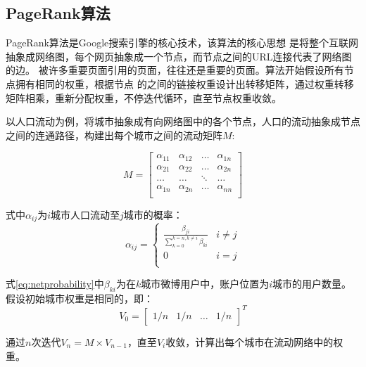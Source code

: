 \subsection{PageRank算法}
PageRank算法是Google搜索引擎的核心技术\cite{Boldi2009PageRank}，该算法的核心思想
是将整个互联网抽象成网络图，每个网页抽象成一个节点，而节点之间的URL连接代表了网络图的边。
被许多重要页面引用的页面，往往还是重要的页面。算法开始假设所有节点拥有相同的权重，根据节点
的之间的链接权重设计出转移矩阵，通过权重转移矩阵相乘，重新分配权重，不停迭代循环，直至节点权重收敛。

以人口流动为例，将城市抽象成有向网络图中的各个节点，人口的流动抽象成节点之间的连通路径，构建出每个城市之间的流动矩阵$M$:

\[
  M=
\begin{bmatrix}
\alpha_{11} & \alpha_{12} & \ldots & \alpha_{1n} \\
\alpha_{21} & \alpha_{22} & \ldots & \alpha_{2n} \\
\ldots & \ldots & \ddots & \ldots \\
\alpha_{1n} & \alpha_{2n} & \ldots & \alpha_{nn} \\
\end{bmatrix}
\]

式中$\alpha_{ij}$为$i$城市人口流动至$j$城市的概率：
\begin{equation}
\label{eq:netprobability}
\alpha_{ij} = 
\left \{
  \begin{array}{cl}
  \frac{\beta_{ji}}{\sum_{k=0}^{k=n,k\ne i}\beta_{ki}} & i\ne j \\
  0 & i=j \\
  \end{array}
\right.
\end{equation}

式\eqref{eq:netprobability}中$\beta_{ki}$为在$k$城市微博用户中，账户位置为$i$城市的用户数量。
假设初始城市权重是相同的，即：
\begin{equation}
\label{eq:initalweight}
 V_0=
  \begin{bmatrix}
  1/n & 1/n & \ldots & 1/n 
  \end{bmatrix}^{T}
\end{equation}

通过$n$次迭代$V_n=M\times V_{n-1}$，直至$V_i$收敛，计算出每个城市在流动网络中的权重。

